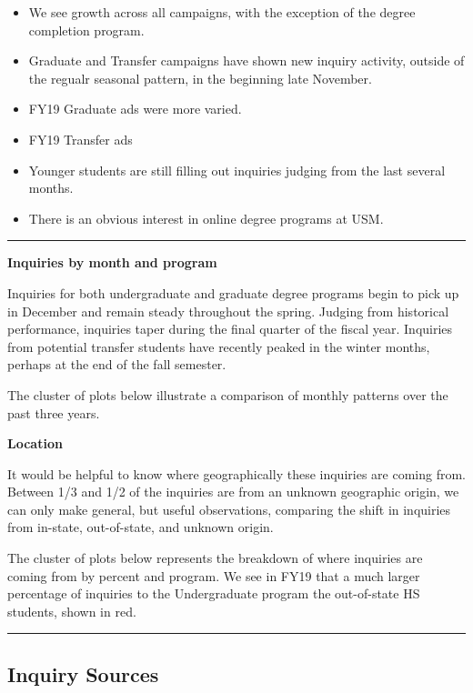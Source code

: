 \documentclass[]{tufte-handout}
\begin{document}
\begin{itemize}
\item
  We see growth across all campaigns, with the exception of the degree
  completion program.
\item
  Graduate and Transfer campaigns have shown new inquiry activity,
  outside of the regualr seasonal pattern, in the beginning late
  November.
\item
  FY19 Graduate ads were more varied.
\item
  FY19 Transfer ads
\item
  Younger students are still filling out inquiries judging from the last
  several months.
\item
  There is an obvious interest in online degree programs at USM.
\end{itemize}

\begin{center}\rule{0.5\linewidth}{\linethickness}\end{center}

\textbf{Inquiries by month and program}

Inquiries for both undergraduate and graduate degree programs begin to
pick up in December and remain steady throughout the spring. Judging
from historical performance, inquiries taper during the final quarter of
the fiscal year. Inquiries from potential transfer students have
recently peaked in the winter months, perhaps at the end of the fall
semester.

The cluster of plots below illustrate a comparison of monthly patterns
over the past three years.

\textbf{Location}

It would be helpful to know where geographically these inquiries are
coming from. Between 1/3 and 1/2 of the inquiries are from an unknown
geographic origin, we can only make general, but useful observations,
comparing the shift in inquiries from in-state, out-of-state, and
unknown origin.

The cluster of plots below represents the breakdown of where inquiries
are coming from by percent and program. We see in FY19 that a much
larger percentage of inquiries to the Undergraduate program the
out-of-state HS students, shown in red.

\begin{center}\rule{0.5\linewidth}{\linethickness}\end{center}

\hypertarget{inquiry-sources}{%
\subsection{Inquiry Sources}\label{inquiry-sources}}
\end{document}
